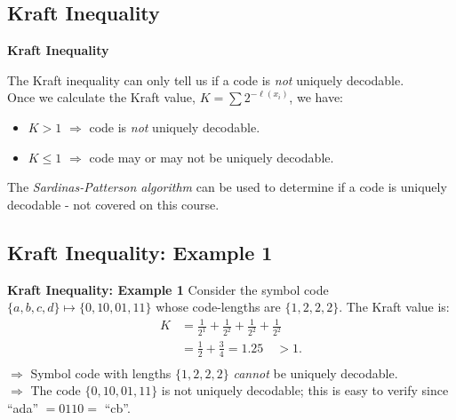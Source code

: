 \documentclass[compress]{beamer}        %
\makeatletter
\newcommand{\tcb}{\textcolor{beamer@blendedblue}}
\makeatother
\begin{document}
\subsection{Kraft Inequality}
\begin{frame}{\bf \tcb{Kraft Inequality}}

The Kraft inequality can only tell us if a code is \emph{not} uniquely decodable.\\[0.7cm]
Once we calculate the Kraft value, $K=\sum 2^{-\ell(x_i)}$, we have:\\[0.4cm]
\begin{itemize}\itemsep0.6cm
\item $K > 1$ $\Rightarrow$ code is \emph{not} uniquely decodable.
\item $K \le 1$  $\Rightarrow$ code may or may not be uniquely decodable.\\[0.9cm]
\end{itemize}

The \emph{Sardinas-Patterson algorithm} can be used to determine if a code is uniquely decodable - not covered on this course.


\end{frame}





\subsection{Kraft Inequality: Example 1}
\begin{frame}{\bf \tcb{Kraft Inequality: Example 1}}
Consider the symbol code $\{a,b,c,d\} \mapsto \{0,10,01,11\}$ whose code-lengths are $\{1,2,2,2\}$. The Kraft value is:\\
\begin{align*}
K &= \frac{1}{2^1}+\frac{1}{2^2}+\frac{1}{2^2}+\frac{1}{2^2} \\[0.5cm]
&= \frac{1}{2} + \frac{3}{4} = 1.25 \quad > 1.\\[-0.2cm]
\end{align*}
$\Rightarrow$ Symbol code with lengths $\{1,2,2,2\}$ \emph{cannot} be uniquely decodable.\\[0.6cm]

$\Rightarrow$ The code $\{0,10,01,11\}$ is not uniquely decodable; this is easy to verify since ``ada'' $= 0110 =$ ``cb''.

\end{frame}
\end{document}
